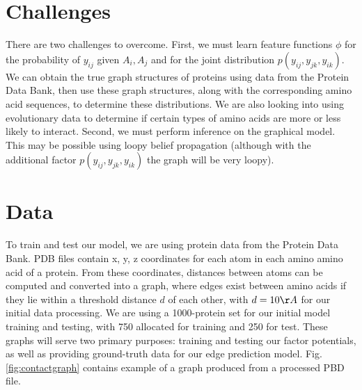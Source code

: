 \documentclass{article}
\begin{document}
\section{Challenges}
There are two challenges to overcome. First, we must learn feature functions $\phi$ for the probability of $y_{ij}$ given $A_i, A_j$ and for the joint distribution $p(y_{ij}, y_{jk}, y_{ik})$. We can obtain the true graph structures of proteins using data from the Protein Data Bank, then use these graph structures, along with the corresponding amino acid sequences, to determine these distributions. We are also looking into using evolutionary data to determine if certain types of amino acids are more or less likely to interact. Second, we must perform inference on the graphical model. This may be possible using loopy belief propagation (although with the additional factor $p(y_{ij}, y_{jk}, y_{ik})$ the graph will be very loopy).


\section{Data}
	To train and test our model, we are using protein data from the Protein Data Bank. PDB files contain x, y, z coordinates for each atom in each amino amino acid of a protein. From these coordinates, distances between atoms can be computed and converted into a graph, where edges exist between amino acids if they lie within a threshold distance $d$ of each other, with $d = 10 {\AA}$ for our initial data processing. We are using a 1000-protein set for our initial model training and testing, with 750 allocated for training and 250 for test. These graphs will serve two primary purposes: training and testing our factor potentials, as well as providing ground-truth data for our edge prediction model. Fig. \ref{fig:contactgraph} contains example of a graph produced from a processed PBD file. 
\end{document}
